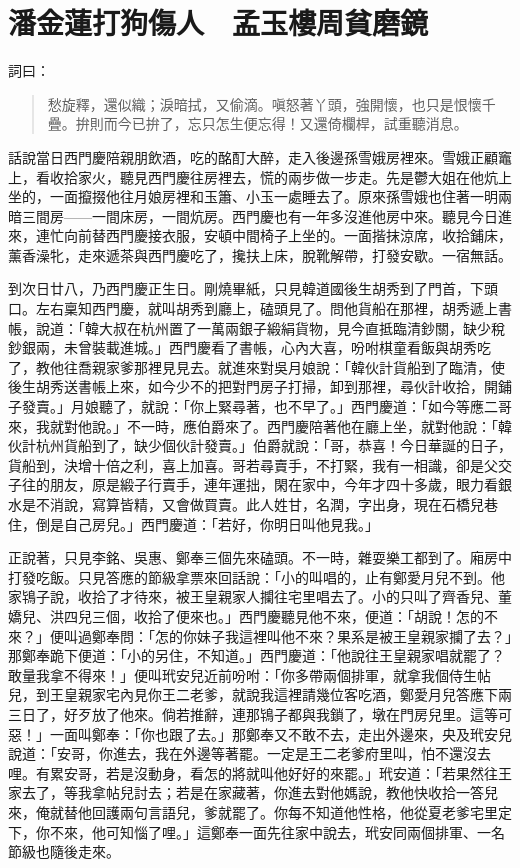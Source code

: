 
\chapter{潘金蓮打狗傷人　孟玉樓周貧磨鏡}

詞曰：
\begin{quote}
愁旋釋，還似織；淚暗拭，又偷滴。嗔怒著丫頭，強開懷，也只是恨懷千疊。拚則而今已拚了，忘只怎生便忘得！又還倚欄桿，試重聽消息。
\end{quote}

話說當日西門慶陪親朋飲酒，吃的酩酊大醉，走入後邊孫雪娥房裡來。雪娥正顧竈上，看收拾家火，聽見西門慶往房裡去，慌的兩步做一步走。先是鬱大姐在他炕上坐的，一面攛掇他往月娘房裡和玉簫、小玉一處睡去了。原來孫雪娥也住著一明兩暗三間房——一間床房，一間炕房。西門慶也有一年多沒進他房中來。聽見今日進來，連忙向前替西門慶接衣服，安頓中間椅子上坐的。一面揩抹涼席，收拾鋪床，薰香澡牝，走來遞茶與西門慶吃了，攙扶上床，脫靴解帶，打發安歇。一宿無話。

到次日廿八，乃西門慶正生日。剛燒畢紙，只見韓道國後生胡秀到了門首，下頭口。左右稟知西門慶，就叫胡秀到廳上，磕頭見了。問他貨船在那裡，胡秀遞上書帳，說道：「韓大叔在杭州置了一萬兩銀子緞絹貨物，見今直抵臨清鈔關，缺少稅鈔銀兩，未曾裝載進城。」西門慶看了書帳，心內大喜，吩咐棋童看飯與胡秀吃了，教他往喬親家爹那裡見見去。就進來對吳月娘說：「韓伙計貨船到了臨清，使後生胡秀送書帳上來，如今少不的把對門房子打掃，卸到那裡，尋伙計收拾，開鋪子發賣。」月娘聽了，就說：「你上緊尋著，也不早了。」西門慶道：「如今等應二哥來，我就對他說。」不一時，應伯爵來了。西門慶陪著他在廳上坐，就對他說：「韓伙計杭州貨船到了，缺少個伙計發賣。」伯爵就說：「哥，恭喜！今日華誕的日子，貨船到，決增十倍之利，喜上加喜。哥若尋賣手，不打緊，我有一相識，卻是父交子往的朋友，原是緞子行賣手，連年運拙，閑在家中，今年才四十多歲，眼力看銀水是不消說，寫算皆精，又會做買賣。此人姓甘，名潤，字出身，現在石橋兒巷住，倒是自己房兒。」西門慶道：「若好，你明日叫他見我。」

正說著，只見李銘、吳惠、鄭奉三個先來磕頭。不一時，雜耍樂工都到了。廂房中打發吃飯。只見答應的節級拿票來回話說：「小的叫唱的，止有鄭愛月兒不到。他家鴇子說，收拾了才待來，被王皇親家人攔往宅里唱去了。小的只叫了齊香兒、董嬌兒、洪四兒三個，收拾了便來也。」西門慶聽見他不來，便道：「胡說！怎的不來？」便叫過鄭奉問：「怎的你妹子我這裡叫他不來？果系是被王皇親家攔了去？」那鄭奉跪下便道：「小的另住，不知道。」西門慶道：「他說往王皇親家唱就罷了？敢量我拿不得來！」便叫玳安兒近前吩咐：「你多帶兩個排軍，就拿我個侍生帖兒，到王皇親家宅內見你王二老爹，就說我這裡請幾位客吃酒，鄭愛月兒答應下兩三日了，好歹放了他來。倘若推辭，連那鴇子都與我鎖了，墩在門房兒里。這等可惡！」一面叫鄭奉：「你也跟了去。」那鄭奉又不敢不去，走出外邊來，央及玳安兒說道：「安哥，你進去，我在外邊等著罷。一定是王二老爹府里叫，怕不還沒去哩。有累安哥，若是沒動身，看怎的將就叫他好好的來罷。」玳安道：「若果然往王家去了，等我拿帖兒討去；若是在家藏著，你進去對他媽說，教他快收拾一答兒來，俺就替他回護兩句言語兒，爹就罷了。你每不知道他性格，他從夏老爹宅里定下，你不來，他可知惱了哩。」這鄭奉一面先往家中說去，玳安同兩個排軍、一名節級也隨後走來。

